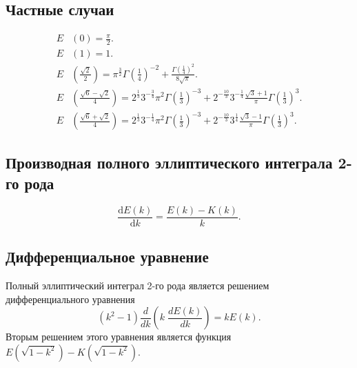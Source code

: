 \documentclass[fleqn]{article}
\begin{document}
	\subsection{Частные случаи}
	\begin{align}
		E&(0)=\frac{\pi}{2}. \nonumber \\
		E&(1)=1. \nonumber \\
		E&\left({\frac {\sqrt {2}}{2}}\right)=\pi ^{\frac {3}{2}}\Gamma \left({\frac {1}{4}}\right)^{-2}+{\frac {\Gamma \left({\frac {1}{4}}\right)^{2}}{8{\sqrt {\pi }}}}. \nonumber \\
		E&\left({\frac {{\sqrt {6}}-{\sqrt {2}}}{4}}\right)=2^{\frac {1}{3}}3^{-{\frac {3}{4}}}\pi ^{2}\Gamma \left({\frac {1}{3}}\right)^{-3}+2^{-{\frac {10}{3}}}3^{-{\frac {1}{4}}}{\frac {{\sqrt {3}}+1}{\pi }}\Gamma \left({\frac {1}{3}}\right)^{3}. \label{eq:4}\\
		E&\left({\frac {{\sqrt {6}}+{\sqrt {2}}}{4}}\right)=2^{\frac {1}{3}}3^{-{\frac {1}{4}}}\pi ^{2}\Gamma \left({\frac {1}{3}}\right)^{-3}+2^{-{\frac {10}{3}}}3^{\frac {1}{4}}{\frac {{\sqrt {3}}-1}{\pi }}\Gamma \left({\frac {1}{3}}\right)^{3}. \nonumber
	\end{align}
	\subsection{Производная полного эллиптического интеграла 2-го рода}
	\begin{equation*}{\frac {\mathrm {d} E(k)}{\mathrm {d} k}}={\frac {E(k)-K(k)}{k}}.\end{equation*}
	\subsection{Дифференциальное уравнение}
	Полный эллиптический интеграл 2-го рода является решением дифференциального уравнения
	\begin{equation*}\left(k^{2}-1\right){\frac {d}{dk}}\left(k\;{\frac {dE(k)}{dk}}\right)=kE(k).\end{equation*}
	Вторым решением этого уравнения является функция $E\left(\sqrt{1-k^2}\right)-K\left(\sqrt{1-k^2}\right).$
\end{document}

